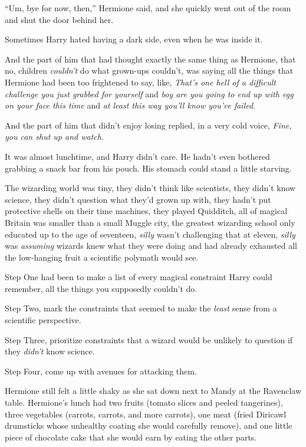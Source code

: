 “Um, bye for now, then,” Hermione said, and she quickly went out of the room and shut the door behind her.

Sometimes Harry hated having a dark side, even when he was inside it.

And the part of him that had thought exactly the same thing as Hermione, that no, children \emph{couldn’t} do what grown-ups couldn’t, was saying all the things that Hermione had been too frightened to say, like, \emph{That’s one hell of a difficult challenge you just grabbed for yourself} and \emph{boy are you going to end up with egg on your face this time} and \emph{at least this way you’ll know you’ve failed.}

And the part of him that didn’t enjoy losing replied, in a very cold voice, \emph{Fine, you can shut up and watch.}

\later

It was almost lunchtime, and Harry didn’t care. He hadn’t even bothered grabbing a snack bar from his pouch. His stomach could stand a little starving.

The wizarding world was tiny, they didn’t think like scientists, they didn’t know science, they didn’t question what they’d grown up with, they hadn’t put protective shells on their time machines, they played Quidditch, all of magical Britain was smaller than a small Muggle city, the greatest wizarding school only educated up to the age of seventeen, \emph{silly} wasn’t challenging that at eleven, \emph{silly} was \emph{assuming} wizards knew what they were doing and had already exhausted all the low-hanging fruit a scientific polymath would see.

Step One had been to make a list of every magical constraint Harry could remember, all the things you supposedly couldn’t do.

Step Two, mark the constraints that seemed to make the \emph{least} sense from a scientific perspective.

Step Three, prioritize constraints that a wizard would be unlikely to question if they \emph{didn’t} know science.

Step Four, come up with avenues for attacking them.

\later

Hermione still felt a little shaky as she sat down next to Mandy at the Ravenclaw table. Hermione’s lunch had two fruits (tomato slices and peeled tangerines), three vegetables (carrots, carrots, and more carrots), one meat (fried Diricawl drumsticks whose unhealthy coating she would carefully remove), and one little piece of chocolate cake that she would earn by eating the other parts.

